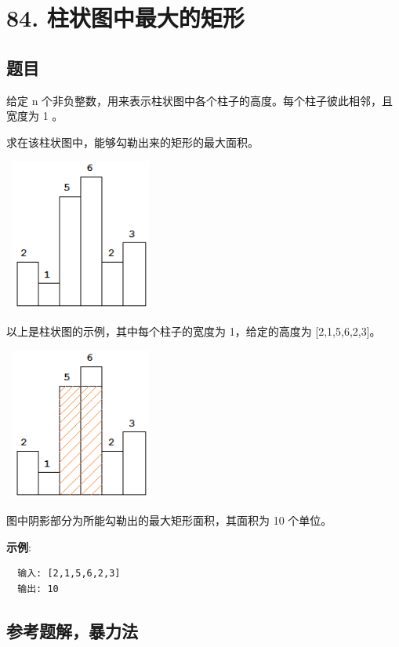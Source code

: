 \newpage
\section{84. 柱状图中最大的矩形}
\label{leetcode:84}

\subsection{题目}

给定 n 个非负整数，用来表示柱状图中各个柱子的高度。每个柱子彼此相邻，且宽度为 1 。

求在该柱状图中，能够勾勒出来的矩形的最大面积。

\includegraphics[width=50mm,height=50mm]{images/leetcode/histogram.png}

以上是柱状图的示例，其中每个柱子的宽度为 1，给定的高度为 [2,1,5,6,2,3]。

\includegraphics[width=50mm,height=50mm]{images/leetcode/histogram_area.png}

图中阴影部分为所能勾勒出的最大矩形面积，其面积为 10 个单位。

\textbf{示例}:

\begin{verbatim}
  输入: [2,1,5,6,2,3]
  输出: 10
\end{verbatim}

\subsection{参考题解，暴力法}

